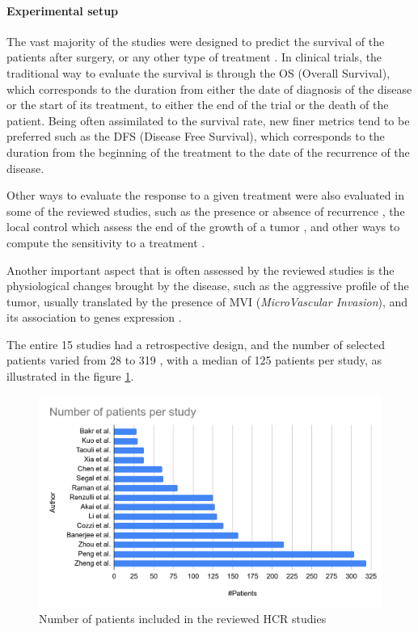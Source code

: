\documentclass[]{article}
\let\oldparagraph\paragraph
\renewcommand{\paragraph}[1]{\oldparagraph{#1}\mbox{}}
\begin{document}


\paragraph{Experimental setup}\label{experimental-setup}

The vast majority of the studies were designed to predict the survival
of the patients after surgery, or any other type of treatment \cite{Cozzi2017,Akai2018,Chen2017,Li2016,Banerjee2015,Segal2007,Zheng2018,Xia2018}. In
clinical trials, the traditional way to evaluate the survival is through
the OS (Overall Survival), which corresponds to the duration from either
the date of diagnosis of the disease or the start of its treatment, to
either the end of the trial or the death of the patient. Being often
assimilated to the survival rate, new finer metrics tend to be preferred
such as the DFS (Disease Free Survival), which corresponds to the
duration from the beginning of the treatment to the date of the
recurrence of the disease.

Other ways to evaluate the response to a given treatment were also
evaluated in some of the reviewed studies, such as the presence or
absence of recurrence \cite{Zhou2017a,Zheng2018}, the local control
which assess the end of the growth of a tumor \cite{Cozzi2017},
and other ways to compute the sensitivity to a treatment \cite{Kuo2007,Li2016}.

Another important aspect that is often assessed by the reviewed studies
is the physiological changes brought by the disease, such as the
aggressive profile of the tumor, usually translated by the presence of
MVI (\emph{MicroVascular Invasion}), and its association to genes
expression \cite{Kuo2007,Banerjee2015,Renzulli2016,Segal2007,Peng2018,Bakr2017,Taouli2017}.

The entire 15 studies had a retrospective design, and the number of
selected patients varied from 28 \cite{Bakr2017} to 319
\cite{Zheng2018}, with a median of 125 patients per study, as illustrated in the figure \ref{HCR_studies_number_of_patients}.


\begin{figure}[th!]
	\centering
	\includegraphics[width=0.7\linewidth]{images/image2}
	\caption{Number of patients included in the reviewed HCR studies}
	\label{HCR_studies_number_of_patients}
\end{figure}
\end{document}
